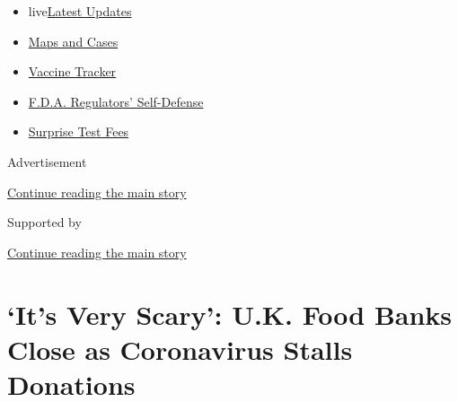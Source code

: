 \begin{itemize}
\tightlist
\item
  live\href{https://www.nytimes3xbfgragh.onion/2020/09/12/world/covid-19-coronavirus.html?name=styln-coronavirus-national\&region=TOP_BANNER\&block=storyline_menu_recirc\&action=click\&pgtype=Article\&impression_id=5fac4400-f52d-11ea-864d-454cfeeecf0d\&variant=undefined}{Latest
  Updates}
\item
  \href{https://www.nytimes3xbfgragh.onion/interactive/2020/us/coronavirus-us-cases.html?name=styln-coronavirus-national\&region=TOP_BANNER\&block=storyline_menu_recirc\&action=click\&pgtype=Article\&impression_id=5fac4401-f52d-11ea-864d-454cfeeecf0d\&variant=undefined}{Maps
  and Cases}
\item
  \href{https://www.nytimes3xbfgragh.onion/interactive/2020/science/coronavirus-vaccine-tracker.html?name=styln-coronavirus-national\&region=TOP_BANNER\&block=storyline_menu_recirc\&action=click\&pgtype=Article\&impression_id=5fac4402-f52d-11ea-864d-454cfeeecf0d\&variant=undefined}{Vaccine
  Tracker}
\item
  \href{https://www.nytimes3xbfgragh.onion/2020/09/10/us/politics/fda-coronavirus-vaccine.html?name=styln-coronavirus-national\&region=TOP_BANNER\&block=storyline_menu_recirc\&action=click\&pgtype=Article\&impression_id=5fac4403-f52d-11ea-864d-454cfeeecf0d\&variant=undefined}{F.D.A.
  Regulators' Self-Defense}
\item
  \href{https://www.nytimes3xbfgragh.onion/2020/09/09/upshot/coronavirus-surprise-test-fees.html?name=styln-coronavirus-national\&region=TOP_BANNER\&block=storyline_menu_recirc\&action=click\&pgtype=Article\&impression_id=5fac6b10-f52d-11ea-864d-454cfeeecf0d\&variant=undefined}{Surprise
  Test Fees}
\end{itemize}

Advertisement

\protect\hyperlink{after-top}{Continue reading the main story}

Supported by

\protect\hyperlink{after-sponsor}{Continue reading the main story}

\hypertarget{its-very-scary-uk-food-banks-close-as-coronavirus-stalls-donations}{%
\section{`It's Very Scary': U.K. Food Banks Close as Coronavirus Stalls
Donations}\label{its-very-scary-uk-food-banks-close-as-coronavirus-stalls-donations}}

